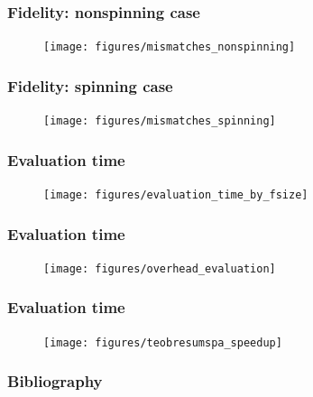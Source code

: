 \documentclass{beamer}
\begin{document}
\begin{frame}
    \frametitle{Fidelity: nonspinning case}
    \begin{figure}[ht]
    \centering
    \texttt{[image: figures/mismatches\_nonspinning]}
    \label{fig:mismatches_nonspinning}
    \end{figure}
\end{frame}

\begin{frame}
    \frametitle{Fidelity: spinning case}
    \begin{figure}[ht]
    \centering
    \texttt{[image: figures/mismatches\_spinning]}
    \end{figure}
\end{frame}

\begin{frame}
    \frametitle{Evaluation time}
    
    \begin{figure}[ht]
    \centering
    \texttt{[image: figures/evaluation\_time\_by\_fsize]}
    \label{fig:evaluation_time_by_fsize}
    \end{figure}
\end{frame}

\begin{frame}
    \frametitle{Evaluation time}
    
    \begin{figure}[ht]
    \centering
    \texttt{[image: figures/overhead\_evaluation]}
    \label{fig:overhead_evaluation}
    \end{figure}
\end{frame}

\begin{frame}
    \frametitle{Evaluation time}
    
    \begin{figure}[ht]
    \centering
    \texttt{[image: figures/teobresumspa\_speedup]}
    \label{fig:teobresumspa_speedup}
    \end{figure}
\end{frame}

\begin{frame}
    \frametitle{}
    
\end{frame}


\begin{frame}
    \frametitle{Bibliography}
    \printbibliography
\end{frame}
\end{document}
